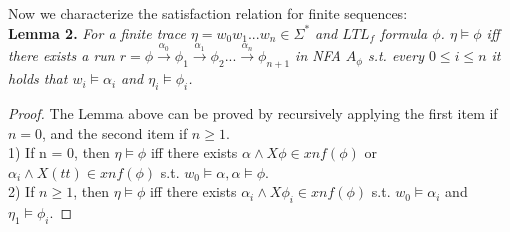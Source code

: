 Now we characterize the satisfaction relation for finite sequences: \\
{\bf Lemma 2.}  {\it For a finite trace $\eta = w_0w_1...w_n \in \Sigma^{*}$ and $LTL_f$ formula $\phi$. $\eta \models \phi$ iff there exists a run $r = \phi \overset{\alpha_0}{\rightarrow}\phi_1\overset{\alpha_1}{\rightarrow}\phi_2...\overset{\alpha_n}{\rightarrow}\phi_{n+1}$ in NFA $A_{\phi}$ s.t. every $0 \leq i \leq n$ it holds that $w_i \models \alpha_i$ and $\eta_i \models \phi_i $.}
\begin{proof}
The Lemma above can be proved by recursively applying the first item if $n = 0$, and the second item if $n \geq 1$. \\
1) If n = 0, then $\eta \models \phi$ iff there exists $ \alpha \wedge X\phi \in xnf(\phi)$ or $\alpha_i \wedge X(tt) \in xnf(\phi)$ s.t. $w_0 \models \alpha, \alpha \models \phi$.\\
2) If $n \geq 1$, then  $\eta \models \phi$ iff there exists  $ \alpha_i \wedge X\phi_i \in xnf(\phi)$ s.t. $w_0 \models \alpha_i$ and $\eta_1 \models \phi_i $.


\end{proof}
